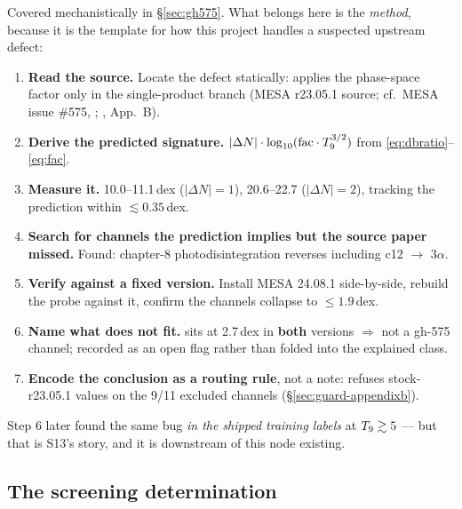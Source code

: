 Covered mechanistically in \S\ref{sec:gh575}. What belongs here is the
\emph{method}, because it is the template for how this project handles a
suspected upstream defect:

\begin{enumerate}
\item \textbf{Read the source.} Locate the defect statically:
       applies the
      phase-space factor only in the single-product branch (MESA r23.05.1
      source; cf.\ MESA issue \#575, \citealp{mesa575}; \citealp{grichener2025},
      App.~B).
\item \textbf{Derive the predicted signature.}
      $|\Delta N|\cdot\log_{10}(\mathrm{fac}\cdot T_{9}^{3/2})$ from
      \eqref{eq:dbratio}--\eqref{eq:fac}.
\item \textbf{Measure it.} 10.0--11.1\,dex ($|\Delta N|{=}1$), 20.6--22.7
      ($|\Delta N|{=}2$), tracking the prediction within
      ${\lesssim}0.35$\,dex.
\item \textbf{Search for channels the prediction implies but the source paper
      missed.} Found: chapter-8 photodisintegration reverses including
      c12 $\to$ 3$\alpha$.
\item \textbf{Verify against a fixed version.} Install MESA 24.08.1
      side-by-side, rebuild the probe against it, confirm the channels collapse
      to $\le 1.9$\,dex.
\item \textbf{Name what does not fit.}  sits at
      2.7\,dex in \textbf{both} versions $\Rightarrow$ not a gh-575 channel;
      recorded as an open flag rather than folded into the explained class.
\item \textbf{Encode the conclusion as a routing rule}, not a note:
       refuses stock-r23.05.1 values on the 9/11
      excluded channels (\S\ref{sec:guard-appendixb}).
\end{enumerate}

Step 6 later found the same bug \emph{in the shipped training labels} at
$T_{9} \gtrsim 5$ --- but that is S13's story, and it is downstream of this node
existing.

\subsection{The screening determination}
\label{sec:screening-determination}

